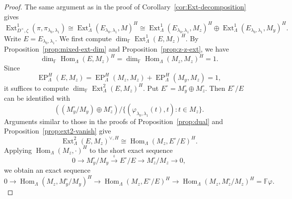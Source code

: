 \documentclass[11pt,a4paper]{article} %
\def\FF{\mathbb{F}}
\def\dim{\operatorname{dim}}
\def\EP{\operatorname{EP}}
\def\Ext{\operatorname{Ext}} %
\def\Hom{\operatorname{Hom}}
\begin{document}
\begin{proof}
    The same argument as in the proof of Corollary~\ref{cor:Ext-decomposition} gives
    \[
    \Ext_{D^\times,\zeta}^1(\pi,\pi_{\lambda_0,\lambda_1})\cong\Ext^1_{\Lambda}(E_{\lambda_0,\lambda_1},M)^H\cong\Ext^1_{\Lambda}(E_{\lambda_0,\lambda_1},M_z)^H\oplus\Ext^1_{\Lambda}(E_{\lambda_0,\lambda_1},M_y)^H.
    \]
    Write $E=E_{\lambda_0,\lambda_1}$. We first compute $\dim_\FF\Ext^1_{\Lambda}(E,M_z)^H$. By Proposition~\ref{prop:mixed-ext-dim} and Proposition~\ref{prop:z-z-ext}, we have
    \[
    \dim_\FF\Hom_{\Lambda}(E,M_z)^H=\dim_\FF\Hom_{\Lambda}(M_z,M_z)^H=1.
    \]
    Since 
    \[
    \EP_\Lambda^H(E,M_z)=\EP_\Lambda^H(M_z,M_z)+\EP_\Lambda^H(M_y,M_z)=1,
    \]
    it suffices to compute $\dim_\FF\Ext^2_{\Lambda}(E,M_z)^H$. Put $E^\circ=M_y^\circ\oplus M_z^\circ$. Then $E^\circ/E$ can be identified with
    \[
    \left((M_y^\circ/M_y)\oplus M_z^\circ\right)/\{\left(\varphi_{\lambda_0,\lambda_1}(t),t\right):t\in M_z\}.
    \]
    Arguments similar to those in the proofs of Proposition~\ref{prop:dual} and Proposition~\ref{prop:ext2-vanish} give
    \[
    \Ext^2_{\Lambda}(E,M_z)^{\vee,H}\cong\Hom_{\Lambda}(M_z,E^\circ/E)^H.
    \]
    Applying $\Hom_{\Lambda}(M_z,\cdot)^H$ to the short exact sequence
    \[
     0\longrightarrow M_y^\circ/M_y\xrightarrow{\,\,\,\iota\,\,\,} E^\circ/E\longrightarrow M_z^\circ/M_z\longrightarrow0,
    \]
    we obtain an exact sequence
    \begin{equation}\label{eq:left-exact}
        0\longrightarrow\Hom_{\Lambda}(M_z,M_y^\circ/M_y)^H\longrightarrow\Hom_{\Lambda}(M_z,E^\circ/E)^H\longrightarrow\Hom_{\Lambda}(M_z,M_z^\circ/M_z)^H=\FF\varphi.
    \end{equation}


\end{proof}
\end{document}
